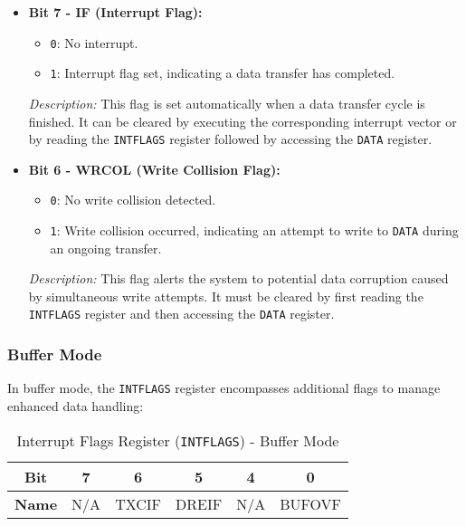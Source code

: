   \begin{itemize}
      \item \textbf{Bit 7 - IF (Interrupt Flag):} 
      \begin{itemize}
          \item \texttt{0}: No interrupt.
          \item \texttt{1}: Interrupt flag set, indicating a data transfer has completed.
      \end{itemize}
      \textit{Description:} This flag is set automatically when a data transfer cycle is finished. It can be cleared by executing the corresponding interrupt vector or by reading the \texttt{INTFLAGS} register followed by accessing the \texttt{DATA} register.
      
      \item \textbf{Bit 6 - WRCOL (Write Collision Flag):} 
      \begin{itemize}
          \item \texttt{0}: No write collision detected.
          \item \texttt{1}: Write collision occurred, indicating an attempt to write to \texttt{DATA} during an ongoing transfer.
      \end{itemize}
      \textit{Description:} This flag alerts the system to potential data corruption caused by simultaneous write attempts. It must be cleared by first reading the \texttt{INTFLAGS} register and then accessing the \texttt{DATA} register.
  \end{itemize}
  
  \subsubsection{Buffer Mode}
  In buffer mode, the \texttt{INTFLAGS} register encompasses additional flags to manage enhanced data handling:
  
  \begin{table}[H]
      \centering
      \caption{Interrupt Flags Register (\texttt{INTFLAGS}) - Buffer Mode}
      \begin{tabular}{@{}cccccc@{}}
          \toprule
          \textbf{Bit} & 7 & 6 & 5 & 4 & 0 \\ \midrule
          \textbf{Name} & N/A & TXCIF & DREIF & N/A & BUFOVF \\ \bottomrule
      \end{tabular}
      \label{tab:intflags_buffer}
  \end{table}
  
